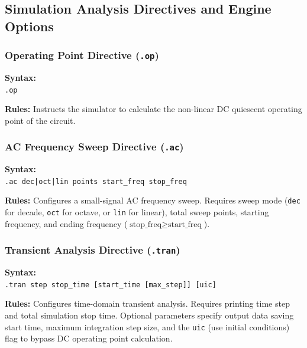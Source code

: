 \subsection{Simulation Analysis Directives and Engine Options}

\subsubsection{Operating Point Directive (\texttt{.op})}
\begin{compactitem}
    \item \textbf{Syntax:} \\
    \texttt{.op}
    \item \textbf{Rules:} Instructs the simulator to calculate the non-linear DC quiescent operating point of the circuit.
\end{compactitem}

\subsubsection{AC Frequency Sweep Directive (\texttt{.ac})}
\begin{compactitem}
    \item \textbf{Syntax:} \\
    \texttt{.ac dec|oct|lin points start\_freq stop\_freq}
    \item \textbf{Rules:} Configures a small-signal AC frequency sweep. Requires sweep mode (\texttt{dec} for decade, \texttt{oct} for octave, or \texttt{lin} for linear), total sweep points, starting frequency, and ending frequency ($\text{stop\_freq} \ge \text{start\_freq}$).
\end{compactitem}

\subsubsection{Transient Analysis Directive (\texttt{.tran})}
\begin{compactitem}
    \item \textbf{Syntax:} \\
    \texttt{.tran step stop\_time [start\_time [max\_step]] [uic]}
    \item \textbf{Rules:} Configures time-domain transient analysis. Requires printing time step and total simulation stop time. Optional parameters specify output data saving start time, maximum integration step size, and the \texttt{uic} (use initial conditions) flag to bypass DC operating point calculation.
\end{compactitem}

